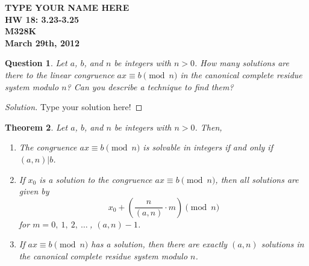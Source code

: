 \documentclass[12pt,leqno]{article}
\numberwithin{equation}{section}
\newtheorem{thm}{Theorem}[section]
\newtheorem{ques}[thm]{Question}
\theoremstyle{definition}
\begin{document}
\thispagestyle{plain}
\begin{flushright}
\large{\textbf{TYPE YOUR NAME HERE \\
HW 18: 3.23-3.25\\
M328K \\
March 29th, 2012 \\}}
\end{flushright}

\markboth{}{} \setcounter{section}{0} \baselineskip=18pt

\setcounter{tocdepth}{4}



\setcounter{section}{3}

\setcounter{thm}{22}

\begin{ques}
Let $a$, $b$, and $n$ be integers with $n > 0$.  How many solutions
are there to the linear congruence $ax \equiv b \pmod{n}$ in the
canonical complete residue system modulo $n$? Can you describe a
technique to find them?
\end{ques}

\begin{proof}[Solution]
Type your solution here!
\end{proof}


\begin{thm}
Let $a$, $b$, and $n$ be integers with $n > 0$. Then,
\begin{enumerate}
\item The congruence $ax \equiv b \pmod{n}$ is solvable in integers if
and only if $(a,n)|b$.
\item If $x_0$ is a solution to the congruence $ax \equiv b\pmod{n}$,
then all solutions are given by \[ x_0 + \left(\frac{n}{(a,n)}\cdot
m\right)\pmod{n}\] for $m = 0,\ 1,\ 2,\ \hdots\ $, $(a, n)-1$.
\item If $ax \equiv b \pmod{n}$ has a solution, then there are exactly
$(a, n)$ solutions in the canonical complete residue system modulo
$n$.
\end{enumerate}
\end{thm}
\end{document}
